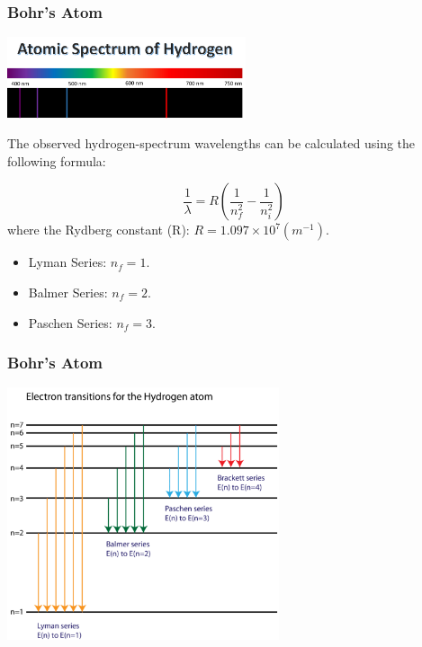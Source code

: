 \documentclass{beamer}
\begin{document}
\begin{frame}\frametitle{Bohr's Atom}
\begin{center}
\includegraphics[width=7cm]{fig/hydrogenspectrum.png}
\end{center}

The observed hydrogen-spectrum wavelengths can be calculated using the following formula:

\[\frac{1}{\lambda} = R (\frac{1}{n_f^2} - \frac{1}{n_i^2})\]
where the Rydberg constant (R): $R = 1.097 \times 10^7 (m^{-1})$.

\begin{itemize}
\item Lyman Series: $n_f = 1$.
\item Balmer Series: $n_f = 2$.
\item Paschen Series: $n_f = 3$.
\end{itemize}
\end{frame}

\begin{frame}\frametitle{Bohr's Atom}
\begin{center}
\includegraphics[width=8cm]{fig/lyman.png}
\end{center}
\end{frame}
\end{document}
